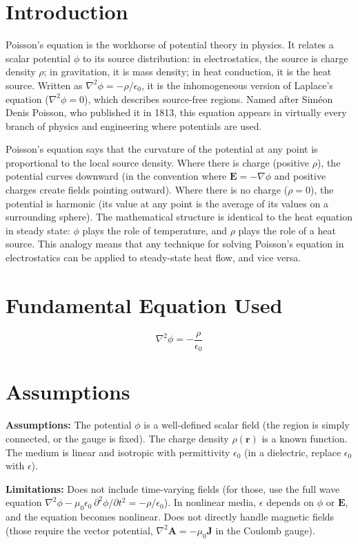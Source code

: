 \documentclass[11pt,openright]{book}
\begin{document}
\section*{Introduction}

Poisson's equation is the workhorse of potential theory in physics. It relates a scalar potential $\phi$ to its source distribution: in electrostatics, the source is charge density $\rho$; in gravitation, it is mass density; in heat conduction, it is the heat source. Written as $\nabla^2\phi = -\rho/\epsilon_0$, it is the inhomogeneous version of Laplace's equation ($\nabla^2\phi = 0$), which describes source-free regions. Named after Siméon Denis Poisson, who published it in 1813, this equation appears in virtually every branch of physics and engineering where potentials are used.

Poisson's equation says that the curvature of the potential at any point is proportional to the local source density. Where there is charge (positive $\rho$), the potential curves downward (in the convention where $\mathbf{E} = -\nabla\phi$ and positive charges create fields pointing outward). Where there is no charge ($\rho = 0$), the potential is harmonic (its value at any point is the average of its values on a surrounding sphere). The mathematical structure is identical to the heat equation in steady state: $\phi$ plays the role of temperature, and $\rho$ plays the role of a heat source. This analogy means that any technique for solving Poisson's equation in electrostatics can be applied to steady-state heat flow, and vice versa.
\section*{Fundamental Equation Used}

\begin{equation}
\nabla^2\phi = -\frac{\rho}{\epsilon_0}
\end{equation}
\section*{Assumptions}

\textbf{Assumptions:} The potential $\phi$ is a well-defined scalar field (the region is simply connected, or the gauge is fixed). The charge density $\rho(\mathbf{r})$ is a known function. The medium is linear and isotropic with permittivity $\epsilon_0$ (in a dielectric, replace $\epsilon_0$ with $\epsilon$).


\textbf{Limitations:} Does not include time-varying fields (for those, use the full wave equation $\nabla^2\phi - \mu_0\epsilon_0\,\partial^2\phi/\partial t^2 = -\rho/\epsilon_0$). In nonlinear media, $\epsilon$ depends on $\phi$ or $\mathbf{E}$, and the equation becomes nonlinear. Does not directly handle magnetic fields (those require the vector potential, $\nabla^2\mathbf{A} = -\mu_0\mathbf{J}$ in the Coulomb gauge).
\end{document}
